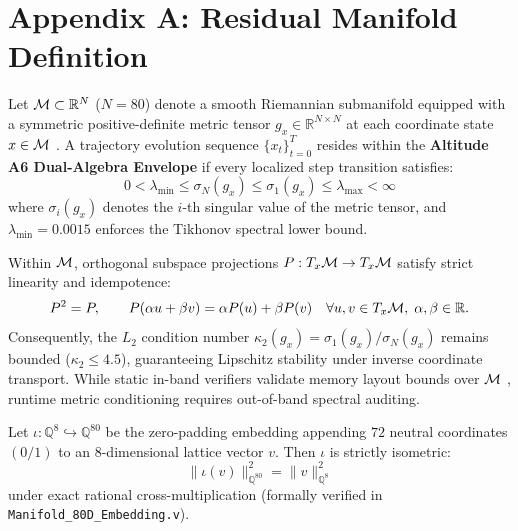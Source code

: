\section*{Appendix A: Residual Manifold Definition}
\label{app:manifold}

\begin{definition}
Let $\mathcal{M} \subset \mathbb{R}^N$ ($N = 80$) denote a smooth Riemannian submanifold equipped with a symmetric positive-definite metric tensor $g_x \in \mathbb{R}^{N \times N}$ at each coordinate state $x \in \mathcal{M}$ \cite{bronstein2021geometric}. A trajectory evolution sequence $\{x_t\}_{t=0}^T$ resides within the \textbf{Altitude A6 Dual-Algebra Envelope} if every localized step transition satisfies:
\begin{equation}
  0 < \lambda_{\min} \le \sigma_N(g_x) \le \sigma_1(g_x) \le \lambda_{\max} < \infty
\end{equation}
where $\sigma_i(g_x)$ denotes the $i$-th singular value of the metric tensor, and $\lambda_{\min} = 0.0015$ enforces the Tikhonov spectral lower bound.
\end{definition}

\begin{proposition}
Within $\mathcal{M}$, orthogonal subspace projections $P : T_x\mathcal{M} \to T_x\mathcal{M}$ satisfy strict linearity and idempotence:
\begin{equation}
  P^2 = P, \qquad P(\alpha u + \beta v) = \alpha P(u) + \beta P(v) \quad \forall u, v \in T_x\mathcal{M},\; \alpha, \beta \in \mathbb{R}.
\end{equation}
Consequently, the $L_2$ condition number $\kappa_2(g_x) = \sigma_1(g_x)/\sigma_N(g_x)$ remains bounded ($\kappa_2 \le 4.5$), guaranteeing Lipschitz stability under inverse coordinate transport. While static in-band verifiers validate memory layout bounds over $\mathcal{M}$ \cite{adacore2026spark}, runtime metric conditioning requires out-of-band spectral auditing.
\end{proposition}

\begin{lemma}
Let $\iota : \mathbb{Q}^8 \hookrightarrow \mathbb{Q}^{80}$ be the zero-padding embedding appending $72$ neutral coordinates $(0/1)$ to an $8$-dimensional lattice vector $v$. Then $\iota$ is strictly isometric:
\begin{equation}
  \|\iota(v)\|_{\mathbb{Q}^{80}}^2 = \|v\|_{\mathbb{Q}^8}^2
\end{equation}
under exact rational cross-multiplication (formally verified in \texttt{Manifold\_80D\_Embedding.v}).
\end{lemma}
